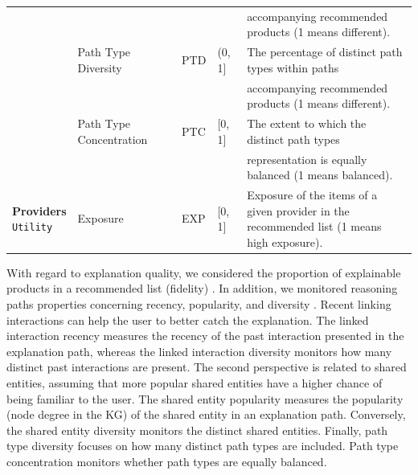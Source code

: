 \documentclass[runningheads]{llncs}
\begin{document}
\begin{table}[!t]
{\begin{tabular}{lllll}
                                     &   &             &  & accompanying recommended products (1 means different).                 \\  
                                     & Path Type Diversity           & PTD             &     (0, 1{]}           &  The percentage of distinct path types within paths            \\  &   &             &  &   accompanying recommended products (1 means different).     \\                                                                                                                     
                                     & Path Type Concentration       & PTC             &    {[}0, 1{]}            & The extent to which the distinct path types   \\
                                     &   &             &  & representation is equally balanced (1 means balanced).     \\  
\hline
\makecell[l]{\textbf{Providers} \\ \texttt{Utility}}                         & Exposure                      & EXP             &     {[}0, 1{]}           &    \makecell[l]{Exposure of the items of a given provider in the \\ recommended list (1 means high exposure).}\\  
\hline                                                                                                                              
\end{tabular}}
\vspace{-6mm}
\end{table}

With regard to explanation quality, we considered the proportion of explainable products in a recommended list (fidelity) \cite{10.1145/3219819.3220072}. 
In addition, we monitored reasoning paths properties concerning recency, popularity, and diversity \cite{10.1145/3477495.3532041}. 
Recent linking interactions can help the user to better catch the explanation. 
The linked interaction recency measures the recency of the past interaction presented in the explanation path,
whereas the linked interaction diversity monitors how many distinct past interactions are present.
The second perspective is related to shared entities, assuming that more popular shared entities have a higher chance of being familiar to the user. 
The shared entity popularity measures the popularity (node degree in the KG) of the shared entity in an explanation path. 
Conversely, the shared entity diversity monitors the distinct shared entities. 
Finally, path type diversity focuses on how many distinct path types are included. 
Path type concentration monitors whether path types are equally balanced. 
\end{document}
